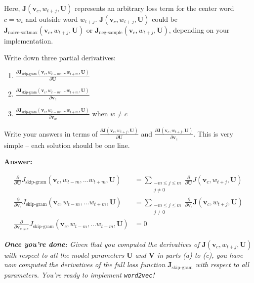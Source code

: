 \documentclass{article}
\newenvironment{answer}{
    {\bf Answer:} \sf \begingroup\color{red}
}{\endgroup}%
\begin{document}
\begin{enumerate}[label=(\alph*)]
Here, $\bm J(\bm v_c, w_{t+j}, \bm U)$ represents an arbitrary loss term for the center word $c=w_t$ and outside word $w_{t+j}$. $\bm J(\bm v_c, w_{t+j}, \bm U)$ could be $\bm J_{\text{naive-softmax}}(\bm v_c, w_{t+j}, \bm U)$ or $\bm J_{\text{neg-sample}}(\bm v_c, w_{t+j}, \bm U)$, depending on your implementation.

Write down three partial derivatives: 
\begin{enumerate}[label=(\roman*)]
    \item ${\frac{\partial \bm J_{\textrm{skip-gram}}(\bm v_c, w_{t-m},\ldots w_{t+m}, \bm U)} {\partial \bm U}}$
    \item ${\frac{\partial \bm J_{\textrm{skip-gram}}(\bm v_c, w_{t-m},\ldots w_{t+m}, \bm U)} {\partial \bm v_c}}$
    \item ${\frac{\partial \bm J_{\textrm{skip-gram}}(\bm v_c, w_{t-m},\ldots w_{t+m}, \bm U)} {\partial \bm v_w}}$ when $w \ne c$
\end{enumerate}
Write your answers in terms of ${\frac{\partial \bm J(\bm v_c, w_{t+j}, \bm U)}{\partial \bm U}}$ and ${\frac{\partial \bm J(\bm v_c, w_{t+j}, \bm U)}{\partial \bm v_c}}$. This is very simple -- each solution should be one line.

\begin{shaded}
\begin{answer}
\begin{align}
    \frac{\partial } {\partial \bm U} J_{\textrm{skip-gram}}(\bm v_c, w_{t-m},\ldots w_{t+m}, \bm U)
    &= \sum_{\substack{-m\le j \le m \\ j\ne 0}} \frac{\partial } {\partial \bm U} J(\bm v_c, w_{t+j}, \bm U) \\
    \frac{\partial } {\partial \bm v_c} J_{\textrm{skip-gram}}(\bm v_c, w_{t-m},\ldots w_{t+m}, \bm U)
    &=  \sum_{\substack{-m\le j \le m \\ j\ne 0}} \frac{\partial } {\partial \bm v_c} \bm J(\bm v_c, w_{t+j}, \bm U) \\
    \frac{\partial } {\partial \bm v_{w\neq c}} J_{\textrm{skip-gram}}(\bm v_c, w_{t-m},\ldots w_{t+m}, \bm U)
    &=  0
\end{align}
\end{answer}
\end{shaded}

\textit{\textbf{Once you're done:} Given that you computed the derivatives of $\bm J(\bm v_c, w_{t+j}, \bm U)$ with respect to all the model parameters $\bm U$ and $\bm V$ in parts (a) to (c), you have now computed the derivatives of the full loss function $\bm J_{\text{skip-gram}}$ with respect to all parameters. You're ready to implement \texttt{word2vec}!} %

\end{enumerate}
\end{document}
